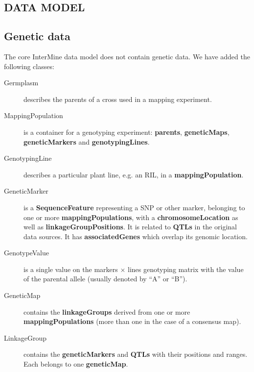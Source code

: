 \documentclass[]{pagposter}
\begin{document}
\begin{multicols*}{3}
  \color{Black}


  \section*{DATA MODEL}

  \subsection*{Genetic data}

  The core InterMine data model does not contain genetic data. We have added the following classes:

  \begin{description}

    \item[Germplasm] describes the parents of a cross used in a mapping experiment.

    \item[MappingPopulation] is a container for a genotyping experiment: \textbf{parents}, \textbf{geneticMaps}, \textbf{geneticMarkers} and \textbf{genotypingLines}.
      
    \item[GenotypingLine] describes a particular plant line, e.g. an RIL, in a \textbf{mappingPopulation}.
      
    \item[GeneticMarker] is a \textbf{SequenceFeature} representing a SNP or other marker, belonging to one or more \textbf{mappingPopulations}, with a \textbf{chromosomeLocation} as well as \textbf{linkageGroupPositions}.
      It is related to \textbf{QTLs} in the original data sources. It has \textbf{associatedGenes} which overlap its genomic location.
      
    \item[GenotypeValue] is a single value on the markers $\times$ lines genotyping matrix with the value of the parental allele (usually denoted by ``A'' or ``B'').
      
    \item[GeneticMap] contains the \textbf{linkageGroups} derived from one or more \textbf{mappingPopulations} (more than one in the case of a consensus map).
      
    \item[LinkageGroup] contains the \textbf{geneticMarkers} and \textbf{QTLs} with their positions and ranges. Each belongs to one \textbf{geneticMap}.
      

\end{description}
\end{multicols*}
\end{document}
